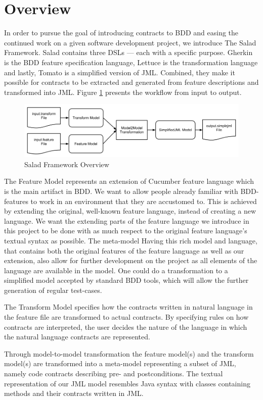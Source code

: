 \section{Overview}

In order to pursue the goal of introducing contracts to BDD and easing the continued work on a given software development project, we introduce The Salad Framework. Salad contains three DSLs --- each with a specific purpose. Gherkin is the BDD feature specification language, Lettuce is the transformation language and lastly, Tomato is a simplified version of JML.  Combined, they make it possible for contracts to be extracted and generated from feature descriptions and transformed into JML. Figure \ref{fig:saladoverview} presents the workflow from input to output.

\begin{figure}
	\begin{center}
		\includegraphics[scale=0.46]{images/framework_overview.png}
	\end{center}
	\caption{Salad Framework Overview}
	\label{fig:saladoverview}
\end{figure}

The Feature Model represents an extension of Cucumber feature language which is the main artifact in BDD. We want to allow people already familiar with BDD-features to work in an environment that they are accustomed to. This is achieved by extending the original, well-known feature language, instead of creating a new language. We want the extending parts of the feature language we introduce in this project to be done with as much respect to the original feature language's textual syntax as possible. The meta-model Having this rich model and language, that contains both the original features of the feature language as well as our extension, also allow for further development on the project as all elements of the language are available in the model. One could do a transformation to a simplified model accepted by standard BDD tools, which will allow the further generation of regular test-cases.

The Transform Model specifies how the contracts written in natural language in the feature file are transformed to actual contracts. By specifying rules on how contracts are interpreted, the user decides the nature of the language in which the natural language contracts are represented. 

Through model-to-model transformation the feature model(s) and the transform model(s) are transformed into a meta-model representing a subset of JML, namely code contracts describing pre- and postconditions. The textual representation of our JML model resembles Java syntax with classes containing methods and their contracts written in JML.
